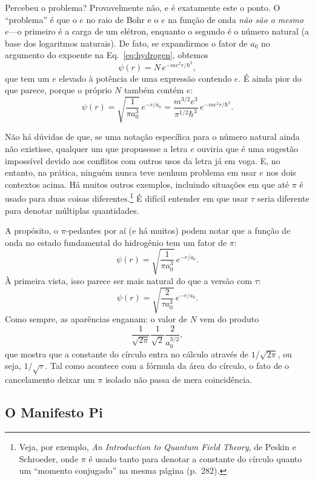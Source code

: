 Percebeu o problema? Provavelmente não, e é exatamente este o ponto. O ``problema'' é que o $e$ no raio de Bohr e o $e$ na função de onda \emph{não são o mesmo $e$}---o primeiro é a carga de um elétron, enquanto o segundo é o número natural (a base dos logaritmos naturais). De fato, se expandirmos o fator de $a_0$ no argumento do expoente na Eq.~\eqref{eq:hydrogen}, obtemos
\[
\psi(r) = N\,e^{-m e^2 r/\hbar^2},
\]
que tem um $e$ elevado à potência de uma expressão contendo $e$. É ainda pior do que parece, porque o próprio $N$ também contém $e$:
\[
\psi(r) = \sqrt{\frac{1}{\pi a_0^3}}\,e^{-r/a_0} =
\frac{m^{3/2} e^3}{\pi^{1/2} \hbar^3}\,e^{-m e^2 r/\hbar^2}.
\]

Não há dúvidas de que, se uma notação específica para o número natural ainda não existisse, qualquer um que propusesse a letra $e$ ouviria que é uma sugestão impossível devido aos conflitos com outros usos da letra já em voga. E, no entanto, na prática, ninguém nunca teve nenhum problema em usar $e$ nos dois contextos acima.
Há muitos outros exemplos, incluindo situações em que até $\pi$ é usado para duas coisas diferentes.\footnote{Veja, por exemplo, \emph{An Introduction to Quantum Field Theory}, de Peskin e Schroeder, onde $\pi$ é usado tanto para denotar a constante do círculo quanto um ``momento conjugado'' na mesma página (p.~282).} É difícil entender em que usar $\tau$ seria diferente para denotar múltiplas quantidades.

A propósito, o $\pi$-pedantes por aí (e há muitos) podem notar que a função de onda no estado fundamental do hidrogênio tem um fator de $\pi$:
\[
\psi(r) = \sqrt{\frac{1}{\pi a_0^3}}\,e^{-r/a_0}.
\]
À primeira vista, isso parece ser mais natural do que a versão com $\tau$:
\[
\psi(r) = \sqrt{\frac{2}{\tau a_0^3}}\,e^{-r/a_0}.
\]
Como sempre, as aparências enganam: o valor de $N$ vem do produto
\[
\frac{1}{\sqrt{2\pi}} \frac{1}{\sqrt{2}} \frac{2}{a_0^{3/2}},
\]
que mostra que a constante do círculo entra no cálculo através de $1/\sqrt{2\pi}$, ou seja, $1/\sqrt{\tau}$. Tal como acontece com a fórmula da área do círculo, o fato de o cancelamento deixar um $\pi$ isolado não passa de mera coincidência.


  \subsection{O Manifesto Pi} %
  \label{sec:the_pi_manifesto_a_rebuttal}

